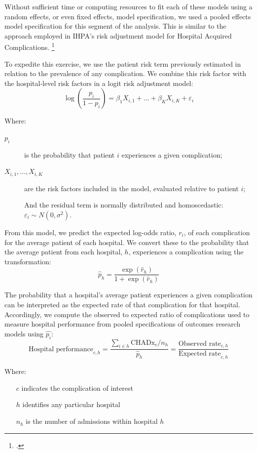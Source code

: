 \documentclass[submission]{grattan}
\begin{document}
Without sufficient time or computing resources to fit each of these models using a random effects, or even fixed effects, model specification, we used a pooled effects model specification for this segment of the analysis.
This is similar to the approach employed in IHPA's risk adjustment model for Hospital Acquired Complications.%
	\footcite{IHPA-2017-Risk-adj-model-tech-specs}

To expedite this exercise, we use the patient risk term previously estimated in relation to the prevalence of any complication.
We combine this risk factor with the hospital-level risk factors in a logit risk adjustment model:
\[\log\left( \frac{p_{i}}{1 - p_{i}} \right) = \beta_{1}X_{i,1} + \ldots + \beta_{K}X_{i,K} + \varepsilon_{i}\]

Where:

\begin{description}
\item[\(p_{i}\)] is the probability that patient \(i\) experiences a given complication;
\item[\(X_{i,1},\dots,X_{i,K}\)] are the risk factors included in the model, evaluated relative to patient \(i\);
\item[]
  And the residual term is normally distributed and homoscedastic: \(\varepsilon_{i} \sim N(0,\sigma^{2})\).
\end{description}

From this model, we predict the expected log-odds ratio, \(r_{i}\), of each complication for the average patient of each hospital.
We convert these to the probability that the average patient from each hospital, \({h}\), experiences a complication using the transformation:
\[{\hat{p}}_{{h}} = \frac{\exp({\hat{r}}_{{h}})}{1 + \exp( {\hat{r}}_{h} )}\]

The probability that a hospital's average patient experiences a given complication can be interpreted as the expected rate of that complication for that hospital.
Accordingly, we compute the observed to expected ratio of complications used to measure hospital performance from pooled specifications of outcomes research models using \(\hat{p_{i}}\):
\[\text{Hospital performance}_{c,h} = \frac{\sum_{i \in h}^{}{\mathrm{CHADx}_{c}}/n_{h}}{{\hat{p}}_{h}} = \frac{\text{Observed\ rate}_{c,h}}{\text{Expected\ rate}_{c,h}}\]

Where:

\begin{itemize}
\item[\(c\)] indicates the complication of interest
\item[\(h\)] identifies any particular hospital
\item[\(n_{h}\)] is the number of admissions within hospital \(h\)
\end{itemize}
\end{document}
